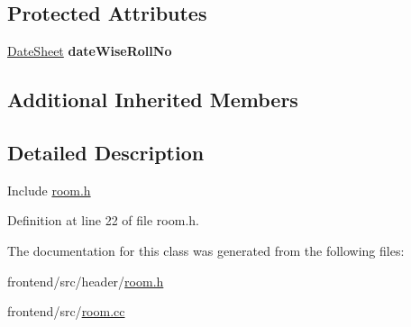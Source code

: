 \subsection*{Protected Attributes}
\begin{DoxyCompactItemize}
\item 
\hypertarget{classRoomDetail_a9bb16ea944d271f428cb36617c051ecd}{\hyperlink{classDateSheet}{Date\-Sheet} {\bfseries date\-Wise\-Roll\-No}}\label{classRoomDetail_a9bb16ea944d271f428cb36617c051ecd}

\end{DoxyCompactItemize}
\subsection*{Additional Inherited Members}


\subsection{Detailed Description}
Include \hyperlink{room_8h}{room.\-h} 

Definition at line 22 of file room.\-h.



The documentation for this class was generated from the following files\-:\begin{DoxyCompactItemize}
\item 
frontend/src/header/\hyperlink{room_8h}{room.\-h}\item 
frontend/src/\hyperlink{room_8cc}{room.\-cc}\end{DoxyCompactItemize}
